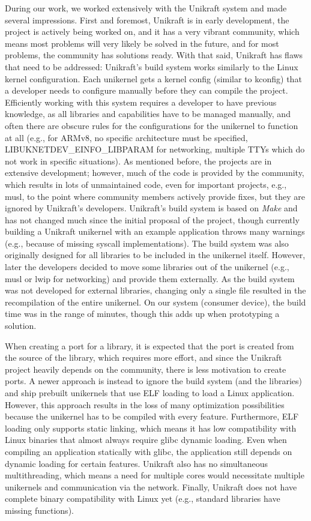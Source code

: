 \documentclass[public,noindent]{aisecreport}
\begin{document}
During our work, we worked extensively with the Unikraft system and made several impressions. First and foremost, Unikraft is in early development, the project is actively being worked on, and it has a very vibrant community, which means most problems will very likely be solved in the future, and for most problems, the community has solutions ready. With that said, Unikraft has flaws that need to be addressed: Unikraft's build system works similarly to the Linux kernel configuration. Each unikernel gets a kernel config (similar to kconfig) that a developer needs to configure manually before they can compile the project. Efficiently working with this system requires a developer to have previous knowledge, as all libraries and capabilities have to be managed manually, and often there are obscure rules for the configurations for the unikernel to function at all (e.g., for ARMv8, no specific architecture must be specified, LIBUKNETDEV\_EINFO\_LIBPARAM for networking, multiple TTYs which do not work in specific situations). As mentioned before, the projects are in extensive development; however, much of the code is provided by the community, which results in lots of unmaintained code, even for important projects, e.g., musl, to the point where community members actively provide fixes, but they are ignored by Unikraft's developers. Unikraft's build system is based on \textit{Make} and has not changed much since the initial proposal of the project, though currently building a Unikraft unikernel with an example application throws many warnings (e.g., because of missing syscall implementations). The build system was also originally designed for all libraries to be included in the unikernel itself. However, later the developers decided to move some libraries out of the unikernel (e.g., musl or lwip for networking) and provide them externally. As the build system was not developed for external libraries, changing only a single file resulted in the recompilation of the entire unikernel. On our system (consumer device), the build time was in the range of minutes, though this adds up when prototyping a solution. 

When creating a port for a library, it is expected that the port is created from the source of the library, which requires more effort, and since the Unikraft project heavily depends on the community, there is less motivation to create ports. A newer approach is instead to ignore the build system (and the libraries) and ship prebuilt unikernels that use ELF loading to load a Linux application. However, this approach results in the loss of many optimization possibilities because the unikernel has to be compiled with every feature. Furthermore, ELF loading only supports static linking, which means it has low compatibility with Linux binaries that almost always require glibc dynamic loading. Even when compiling an application statically with glibc, the application still depends on dynamic loading for certain features. Unikraft also has no simultaneous multithreading, which means a need for multiple cores would necessitate multiple unikernels and communication via the network. Finally, Unikraft does not have complete binary compatibility with Linux yet (e.g., standard libraries have missing functions). 
\end{document}
